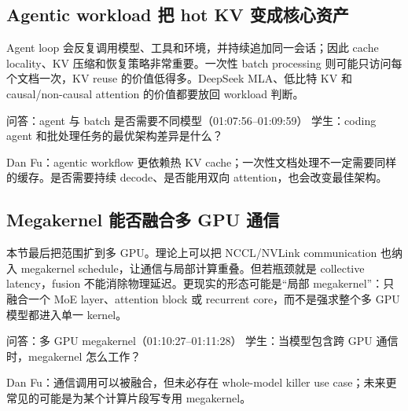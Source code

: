 \documentclass[a4paper]{article}
\begin{document}

\subsection{Agentic workload 把 hot KV 变成核心资产}

Agent loop 会反复调用模型、工具和环境，并持续追加同一会话；因此 cache locality、KV 压缩和恢复策略非常重要。一次性 batch processing 则可能只访问每个文档一次，KV reuse 的价值低得多。DeepSeek MLA、低比特 KV 和 causal/non-causal attention 的价值都要放回 workload 判断。

\begin{dialoguebox}{问答：agent 与 batch 是否需要不同模型（01:07:56--01:09:59）}
学生：coding agent 和批处理任务的最优架构差异是什么？\par
Dan Fu：agentic workflow 更依赖热 KV cache；一次性文档处理不一定需要同样的缓存。是否需要持续 decode、是否能用双向 attention，也会改变最佳架构。
\end{dialoguebox}


\subsection{Megakernel 能否融合多 GPU 通信}

本节最后把范围扩到多 GPU。理论上可以把 NCCL/NVLink communication 也纳入 megakernel schedule，让通信与局部计算重叠。但若瓶颈就是 collective latency，fusion 不能消除物理延迟。更现实的形态可能是“局部 megakernel”：只融合一个 MoE layer、attention block 或 recurrent core，而不是强求整个多 GPU 模型都进入单一 kernel。

\begin{dialoguebox}{问答：多 GPU megakernel（01:10:27--01:11:28）}
学生：当模型包含跨 GPU 通信时，megakernel 怎么工作？\par
Dan Fu：通信调用可以被融合，但未必存在 whole-model killer use case；未来更常见的可能是为某个计算片段写专用 megakernel。
\end{dialoguebox}

\end{document}
